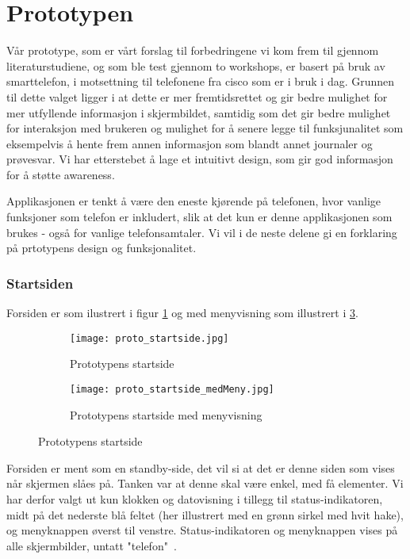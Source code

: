 \section{Prototypen}
\label{prototypen}

Vår prototype, som er vårt forslag til forbedringene vi kom frem til gjennom literaturstudiene, og som ble test gjennom to workshops, er basert på bruk av smarttelefon, i motsettning til telefonene fra cisco som er i bruk i dag. Grunnen til dette valget ligger i at dette er mer fremtidsrettet og gir bedre mulighet for mer utfyllende informasjon i skjermbildet, samtidig som det gir bedre mulighet for interaksjon med brukeren og mulighet for å senere legge til funksjunalitet som eksempelvis å hente frem annen informasjon som blandt annet journaler og prøvesvar. Vi har etterstebet å lage et intuitivt design, som gir god informasjon for å støtte awareness.

\noindent
Applikasjonen er tenkt å være den eneste kjørende på telefonen, hvor vanlige funksjoner som telefon er inkludert, slik at det kun er denne applikasjonen som brukes - også for vanlige telefonsamtaler. Vi vil i de neste delene gi en forklaring på prtotypens design og funksjonalitet.

\subsubsection{Startsiden}
Forsiden er som ilustrert i figur \ref{proto_startside} og med menyvisning som illustrert i \ref{proto_startside_medMeny}.

\begin{figure}[H]
	\centering
	\begin{subfigure}[b]{0.48\textwidth}
		\texttt{[image: proto\_startside.jpg]}
		\caption{Prototypens startside}
		\label{proto_startside}
	\end{subfigure}
	\begin{subfigure}[b]{0.48\textwidth}
		\texttt{[image: proto\_startside\_medMeny.jpg]}
		\caption{Prototypens startside med menyvisning}
		\label{proto_startside_medMeny}
	\end{subfigure}
	\caption{Prototypens startside}
\end{figure}

\noindent
Forsiden er ment som en standby-side, det vil si at det er denne siden som vises når skjermen slåes på. Tanken var at denne skal være enkel, med få elementer. Vi har derfor valgt ut kun klokken og datovisning i tillegg til status-indikatoren, midt på det nederste blå feltet (her illustrert med en grønn sirkel med hvit hake), og menyknappen øverst til venstre. Status-indikatoren og menyknappen vises på alle skjermbilder, untatt "telefon"\ . 

